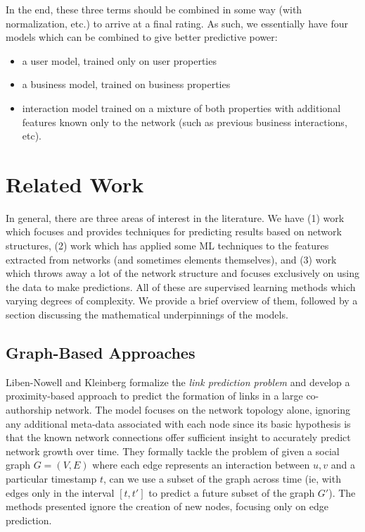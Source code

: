 \documentclass[letterpaper, 10 pt, conference]{ieeeconf}  %
\begin{document}
In the end, these three terms should be combined in some way (with normalization, etc.) to arrive at a final rating. As such, we essentially have four models which can be combined to give better predictive power:

\begin{itemize}
\item a user model, trained only on user properties
\item a business model, trained on business properties
\item interaction model trained on a mixture of both properties with additional features known only to the network (such as previous business interactions, etc).
\end{itemize}

\section{Related Work}
In general, there are three areas of interest in the literature. We have (1) work which focuses and provides techniques for predicting results based on network structures, (2) work which has applied some ML techniques to the features extracted from networks (and sometimes elements themselves), and (3) work which throws away a lot of the network structure and focuses exclusively on using the data to make predictions. All of these are supervised learning methods which varying degrees of complexity. We provide a brief overview of them, followed by a section discussing the mathematical underpinnings of the models.

\subsection{Graph-Based Approaches}

Liben-Nowell and Kleinberg \cite{TheLinkPredictionProblemForSocialNetworks} formalize the \textit{link prediction problem} and develop a proximity-based approach to predict the formation of links in a large co-authorship network. The model focuses on the network topology alone, ignoring any additional meta-data associated with each node since its basic hypothesis is that the known network connections offer sufficient insight to accurately predict network growth over time. They formally tackle the problem of given a social graph $G = (V,E)$ where each edge represents an interaction between $u,v$ and a particular timestamp $t$, can we use a subset of the graph across time (ie, with edges only in the interval $[t,t']$ to predict a future subset of the graph $G'$). The methods presented ignore the creation of new nodes, focusing only on edge prediction.
\end{document}
